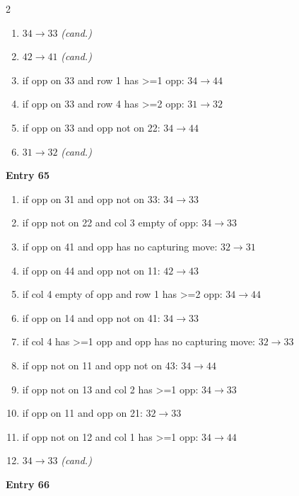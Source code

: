\begin{multicols}{2}
\begin{tikzpicture}[scale=0.24]
\end{tikzpicture}
\nopagebreak\begin{enumerate}[topsep=1pt,itemsep=0pt,parsep=0pt,leftmargin=2.2em,label=\arabic*.]
\item $34\!\to\!33$ \hfill\textit{(cand.)}
\item $42\!\to\!41$ \hfill\textit{(cand.)}
\item if opp on 33 and row 1 has >=1 opp: $34\!\to\!44$
\item if opp on 33 and row 4 has >=2 opp: $31\!\to\!32$
\item if opp on 33 and opp not on 22: $34\!\to\!44$
\item $31\!\to\!32$ \hfill\textit{(cand.)}
\end{enumerate}\smallskip
\noindent\textbf{Entry 65} \; 
\nopagebreak\begin{enumerate}[topsep=1pt,itemsep=0pt,parsep=0pt,leftmargin=2.2em,label=\arabic*.]
\item if opp on 31 and opp not on 33: $34\!\to\!33$
\item if opp not on 22 and col 3 empty of opp: $34\!\to\!33$
\item if opp on 41 and opp has no capturing move: $32\!\to\!31$
\item if opp on 44 and opp not on 11: $42\!\to\!43$
\item if col 4 empty of opp and row 1 has >=2 opp: $34\!\to\!44$
\item if opp on 14 and opp not on 41: $34\!\to\!33$
\item if col 4 has >=1 opp and opp has no capturing move: $32\!\to\!33$
\item if opp not on 11 and opp not on 43: $34\!\to\!44$
\item if opp not on 13 and col 2 has >=1 opp: $34\!\to\!33$
\item if opp on 11 and opp on 21: $32\!\to\!33$
\item if opp not on 12 and col 1 has >=1 opp: $34\!\to\!44$
\item $34\!\to\!33$ \hfill\textit{(cand.)}
\end{enumerate}\smallskip
\noindent\textbf{Entry 66} \; 
\end{multicols}
